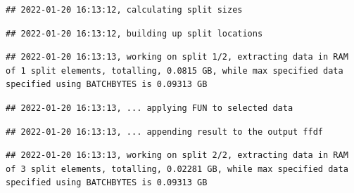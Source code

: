 \documentclass[
  12pt,
]{style/krantz}
\newenvironment{Shaded}{\begin{snugshade}}{\end{snugshade}}
\newcommand{\AttributeTok}[1]{\textcolor[rgb]{0.77,0.63,0.00}{#1}}
\newcommand{\CommentTok}[1]{\textcolor[rgb]{0.56,0.35,0.01}{\textit{#1}}}
\newcommand{\ConstantTok}[1]{\textcolor[rgb]{0.00,0.00,0.00}{#1}}
\newcommand{\ControlFlowTok}[1]{\textcolor[rgb]{0.13,0.29,0.53}{\textbf{#1}}}
\newcommand{\DecValTok}[1]{\textcolor[rgb]{0.00,0.00,0.81}{#1}}
\newcommand{\FunctionTok}[1]{\textcolor[rgb]{0.00,0.00,0.00}{#1}}
\newcommand{\NormalTok}[1]{#1}
\newcommand{\OtherTok}[1]{\textcolor[rgb]{0.56,0.35,0.01}{#1}}
\newcommand{\SpecialCharTok}[1]{\textcolor[rgb]{0.00,0.00,0.00}{#1}}
\begin{document}
\begin{Shaded}
\end{Shaded}

\begin{verbatim}
## 2022-01-20 16:13:12, calculating split sizes
\end{verbatim}

\begin{verbatim}
## 2022-01-20 16:13:12, building up split locations
\end{verbatim}

\begin{verbatim}
## 2022-01-20 16:13:13, working on split 1/2, extracting data in RAM of 1 split elements, totalling, 0.0815 GB, while max specified data specified using BATCHBYTES is 0.09313 GB
\end{verbatim}

\begin{verbatim}
## 2022-01-20 16:13:13, ... applying FUN to selected data
\end{verbatim}

\begin{verbatim}
## 2022-01-20 16:13:13, ... appending result to the output ffdf
\end{verbatim}

\begin{verbatim}
## 2022-01-20 16:13:13, working on split 2/2, extracting data in RAM of 3 split elements, totalling, 0.02281 GB, while max specified data specified using BATCHBYTES is 0.09313 GB
\end{verbatim}
\end{document}
